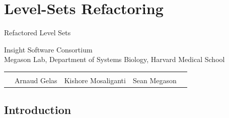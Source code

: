 \section{Level-Sets Refactoring}
{
\color{white}
\begin{frame}[plain]
\fontsize{36pt}{36pt}\selectfont
\center
\begin{center}
Refactored Level Sets
\newline
\end{center}

\fontsize{12pt}{12pt}\selectfont
Insight Software Consortium\\
Megason Lab, Department of Systems Biology, Harvard Medical School
\newline
\begin{tabular}{cp{}p{}p{}c}
\\
\\
&
\centering{}Arnaud Gelas &
\centering{}Kishore Mosaliganti &
\centering{}Sean Megason & \\
\end{tabular}
\end{frame}
}

\subsection{Introduction}


